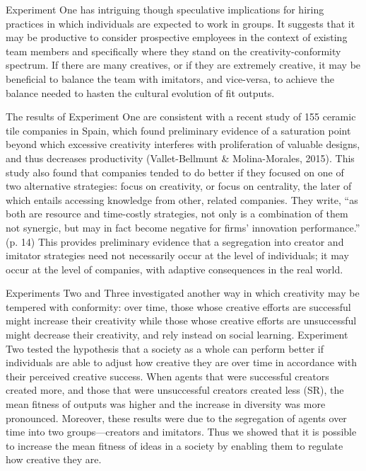 \documentclass[a4paper,12pt,man,british]{apa6}
\begin{document}
Experiment One has intriguing though speculative implications for hiring practices in which individuals are expected to work in groups. It suggests that it may be productive to consider prospective employees in the context of existing team members and specifically where they stand on the creativity-conformity spectrum. If there are many creatives, or if they are extremely creative, it may be beneficial to balance the team with imitators, and vice-versa, to achieve the balance needed to hasten the cultural evolution of fit outputs. 

The results of Experiment One are consistent with a recent study of 155 ceramic tile companies in Spain, which found preliminary evidence of a saturation point beyond which excessive creativity interferes with proliferation of valuable designs, and thus decreases productivity (Vallet-Bellmunt \& Molina-Morales, 2015). This study also found that companies tended to do better if they focused on one of two alternative strategies: focus on creativity, or focus on centrality, the later of which entails accessing knowledge from other, related companies. They write, ``as both are resource and time-costly strategies, not only is a combination of them not synergic, but may in fact become negative for firms’ innovation performance.'' (p. 14) This provides preliminary evidence that a segregation into creator and imitator strategies need not necessarily occur at the level of individuals; it may occur at the level of companies, with adaptive consequences in the real world. 

Experiments Two and Three investigated another way in which creativity may be tempered with conformity: over time, those whose creative efforts are successful might increase their creativity while  those whose creative efforts are unsuccessful might decrease their creativity, and rely instead on social learning. 
Experiment Two tested the hypothesis  that a society as a whole can perform better if individuals are able to adjust how creative they are over time in accordance with their perceived creative success. When agents that were successful creators created more, and those that were unsuccessful creators created less (SR), the mean fitness of outputs was higher and the increase in diversity was more pronounced. Moreover, these results were due  to the segregation of agents over time into two groups---creators and imitators. Thus we showed that it is possible to increase the mean fitness of ideas in a society by enabling them to regulate how creative they are.
\end{document}
